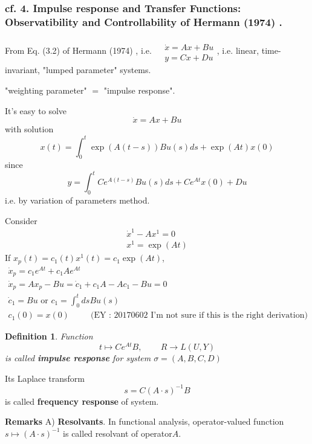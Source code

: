 \documentclass[10pt]{amsart}
\newtheorem{definition}{Definition}
\begin{document}
\begin{multicols*}{2}
\subsubsection{cf. 4. Impulse response and Transfer Functions: Observatibility and Controllability of Hermann (1974) \cite{Herm1974}.  }

From Eq. (3.2) of Hermann (1974) \cite{Herm1974}, i.e. $\begin{aligned} & \quad \\ 
	& \dot{x} = Ax + Bu \\
	& y = Cx+Du \end{aligned}$, i.e. linear, time-invariant, "lumped parameter" systems.  

"weighting parameter" $=$ "impulse response".  

It's easy to solve
\[
\dot{x} = Ax + Bu 
\]
with solution
\[
x(t) = \int_0^t \exp{ (A(t-s) )} Bu(s)ds + \exp{(At)} x(0)
\]
since
\[
y = \int_0^t Ce^{A(t-s)} Bu(s)ds + Ce^{At} x(0) + Du
\]
i.e. by variation of parameters method.  

Consider 
\[
\begin{gathered}
	\dot{x}^1 - Ax^1 = 0 \\
x^1 = \exp{(At)}
\end{gathered}
\]
If $x_p(t) = c_1(t)x^1(t) = c_1 \exp{ (At) }$, 
\[
\begin{gathered}
\dot{x}_p = c_1e^{At} + c_1 Ae^{At} \\ 
\dot{x}_p = Ax_p - Bu = \dot{c}_1 + c_1 A - Ac_1 - Bu = 0  \\
\dot{c}_1 = Bu \text{ or } c_1 = \int_0^t ds Bu(s) \\
c_1(0) = x(0)   \qquad \, \text{ (EY : 20170602 I'm not sure if this is the right derivation) } 
\end{gathered}
\]
\begin{definition}
	Function 
\begin{equation}
	t\mapsto Ce^{At}B , \qquad \, R \to L(U,Y)
\end{equation}
is called \textbf{ impulse response } for system $\sigma = (A,B,C,D)$
\end{definition}

Its Laplace transform 
\begin{equation}
	s=C(A\cdot s)^{-1}B
\end{equation}
is called \textbf{frequency response} of system.  

\textbf{Remarks} A) \textbf{Resolvants}.  In functional analysis, operator-valued function $s\mapsto (A\cdot s)^{-1}$ is called resolvant of operator$A$.  


\end{multicols*}
\end{document}

